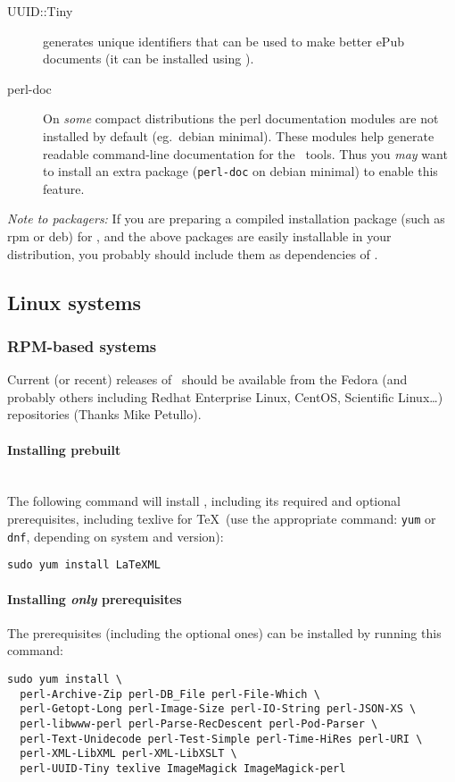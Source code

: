 \documentclass{article}
\begin{document}
\begin{description}
\item[UUID::Tiny] generates unique identifiers that can be used to make better ePub documents
  (it can be installed using ).

\item[perl-doc]\label{get.perl-doc}
 On \emph{some} compact distributions the perl documentation modules
 are not installed by default (eg.~debian minimal). These modules help generate
 readable command-line documentation for the \LaTeXML\ tools. Thus you \emph{may}
 want to install an extra package (\texttt{perl-doc} on debian minimal) to enable this feature. 

\end{description}
\emph{Note to packagers:} If you are preparing a compiled installation package (such as rpm or deb) for
\LaTeXML, and the above packages are easily installable in your distribution,
you probably should include them as dependencies of \LaTeXML.

\subsection{Linux systems}\label{get.linux}
\subsubsection[RPM-based systems]{RPM-based systems}\label{get.linux.rpm}
Current (or recent) releases of \LaTeXML\ should be available from
the Fedora (and probably others including Redhat Enterprise Linux, CentOS, Scientific Linux\ldots)
repositories (Thanks Mike Petullo).

\paragraph*{Installing prebuilt}\\
The following command will install \LaTeXML, including its required
and optional prerequisites, including texlive for \TeX\
(use the appropriate command: \texttt{yum} or \texttt{dnf}, depending on system and version):
\begin{lstlisting}[style=shell]
sudo yum install LaTeXML
\end{lstlisting}

\paragraph*{Installing \emph{only} prerequisites}\label{get.linux.rpm.prereq}
The prerequisites (including the optional ones) can be installed
by running this command: 
\begin{lstlisting}[style=shell]
sudo yum install \
  perl-Archive-Zip perl-DB_File perl-File-Which \
  perl-Getopt-Long perl-Image-Size perl-IO-String perl-JSON-XS \
  perl-libwww-perl perl-Parse-RecDescent perl-Pod-Parser \
  perl-Text-Unidecode perl-Test-Simple perl-Time-HiRes perl-URI \
  perl-XML-LibXML perl-XML-LibXSLT \
  perl-UUID-Tiny texlive ImageMagick ImageMagick-perl
\end{lstlisting}
\end{document}
